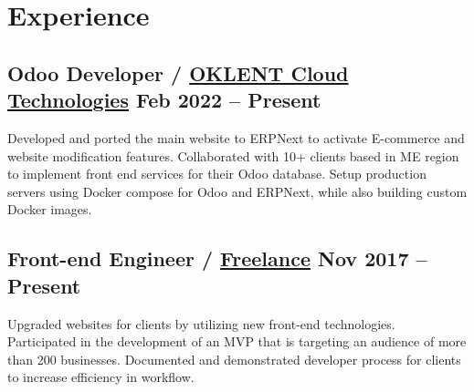 \section*{Experience}
%
%
%
\subsection*{
  Odoo Developer / \href{https://oklent.com/}{OKLENT Cloud Technologies}
  \hspace*{\fill}
  \dateformat Feb 2022 -- Present
}
\begin{tasks}
  \task Developed and ported the main website to ERPNext to activate E-commerce and website modification features.
  \task Collaborated with 10+ clients based in ME region to implement front end services for their Odoo database.
  \task Setup production servers using Docker compose for Odoo and ERPNext, while also building custom Docker images.
\end{tasks}
%
%
\subsection*{
  Front-end Engineer / \href{https://bumbleboss.xyz/}{Freelance}
  \hspace*{\fill}
  \dateformat Nov 2017 -- Present
}
\begin{tasks}
  \task Upgraded websites for clients by utilizing new front-end technologies.
  \task Participated in the development of an MVP that is targeting an audience of more than 200 businesses.
  \task Documented and demonstrated developer process for clients to increase efficiency in workflow.
\end{tasks}
